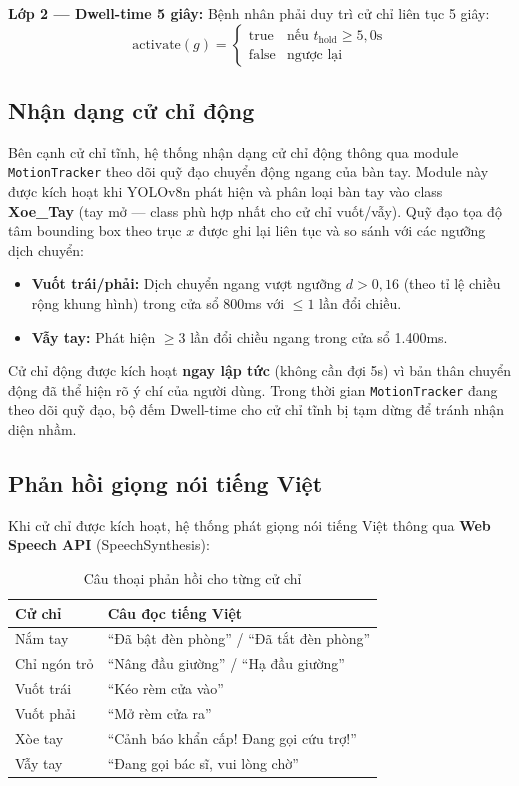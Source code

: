 \documentclass[conference]{IEEEtran}
\begin{document}
\textbf{Lớp 2 --- Dwell-time 5 giây:} Bệnh nhân phải duy trì cử chỉ liên tục 5 giây:
\begin{equation}
\text{activate}(g) = \begin{cases} \text{true} & \text{nếu } t_{\text{hold}} \geq 5{,}0\text{s} \\ \text{false} & \text{ngược lại} \end{cases}
\end{equation}

\subsection{Nhận dạng cử chỉ động}

Bên cạnh cử chỉ tĩnh, hệ thống nhận dạng cử chỉ động thông qua module \texttt{MotionTracker} theo dõi quỹ đạo chuyển động ngang của bàn tay. Module này được kích hoạt khi YOLOv8n phát hiện và phân loại bàn tay vào class \textbf{Xoe\_Tay} (tay mở --- class phù hợp nhất cho cử chỉ vuốt/vẫy). Quỹ đạo tọa độ tâm bounding box theo trục $x$ được ghi lại liên tục và so sánh với các ngưỡng dịch chuyển:

\begin{itemize}[noitemsep]
    \item \textbf{Vuốt trái/phải:} Dịch chuyển ngang vượt ngưỡng $d > 0{,}16$ (theo tỉ lệ chiều rộng khung hình) trong cửa sổ 800ms với $\leq 1$ lần đổi chiều.
    \item \textbf{Vẫy tay:} Phát hiện $\geq 3$ lần đổi chiều ngang trong cửa sổ 1.400ms.
\end{itemize}

Cử chỉ động được kích hoạt \textbf{ngay lập tức} (không cần đợi 5s) vì bản thân chuyển động đã thể hiện rõ ý chí của người dùng. Trong thời gian \texttt{MotionTracker} đang theo dõi quỹ đạo, bộ đếm Dwell-time cho cử chỉ tĩnh bị tạm dừng để tránh nhận diện nhầm.

\subsection{Phản hồi giọng nói tiếng Việt}

Khi cử chỉ được kích hoạt, hệ thống phát giọng nói tiếng Việt thông qua \textbf{Web Speech API} (SpeechSynthesis):

\begin{table}[h]
\centering
\caption{Câu thoại phản hồi cho từng cử chỉ}
\label{tab:voice}
\begin{tabular}{l|l}
\hline
\textbf{Cử chỉ} & \textbf{Câu đọc tiếng Việt} \\
\hline
Nắm tay & ``Đã bật đèn phòng'' / ``Đã tắt đèn phòng'' \\
Chỉ ngón trỏ & ``Nâng đầu giường'' / ``Hạ đầu giường'' \\
Vuốt trái & ``Kéo rèm cửa vào'' \\
Vuốt phải & ``Mở rèm cửa ra'' \\
Xòe tay & ``Cảnh báo khẩn cấp! Đang gọi cứu trợ!'' \\
Vẫy tay & ``Đang gọi bác sĩ, vui lòng chờ'' \\
\hline
\end{tabular}
\end{table}
\end{document}
